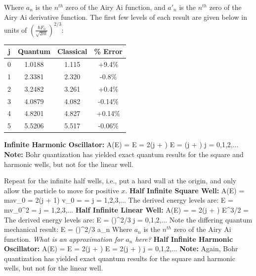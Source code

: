 \ee
Where $a_n$ is the $n^{th}$ zero of the Airy Ai function, and $a'_n$ is the $n^{th}$ zero of the Airy Ai derivative function. The first few levels of each result are given below in units of $\left(\frac{\hbar F_0}{\sqrt{2m}}\right)^{2/3}$:
\begin{center}
\begin{tabular}{ |c|c|c|c| } 
 \hline
 j & Quantum & Classical & \% Error \\ 
 \hline
 0 & 1.0188 & 1.115 & +9.4\% \\ 
 \hline
 1 & 2.3381 & 2.320 & -0.8\% \\ 
 \hline
 2 & 3.2482 & 3.261 & +0.4\% \\ 
 \hline
 3 & 4.0879 & 4.082 & -0.14\% \\
 \hline
 4 & 4.8201 & 4.827 & +0.14\% \\
 \hline
 5 & 5.5206 & 5.517 & -0.06\% \\
 \hline
\end{tabular}
\end{center}
\textbf{Infinite Harmonic Oscillator:} 
\be
A(E) = \frac{2\pi}{\omega}E = 2\pi\hbar\left(j + \right) \thus E = \hbar\omega \left(j + \right)  j = 0,1,2,...
\ee
\textbf{Note:} Bohr quantization has yielded exact quantum results for the square and harmonic wells, but not for the linear well.
\item Repeat for the infinite half wells, i.e., put a hard wall at the origin, and only allow the particle to move for positive $x$.
\newline \textbf{Half Infinite Square Well:}
\be
A(E) = mav_0 = 2\pi\hbar(j + 1) \thus v_0 =  =   j = 1,2,3,...
\ee
The derived energy levels are:
\be
E = mv_0^2 =   j = 1,2,3,...
\ee
\textbf{Half Infinite Linear Well:}
\be
A(E) =  = 2\pi\hbar\left(j + \right) \thus E^{3/2} = 
\ee
The derived energy levels are:
\be
E = \left(\right)^{2/3}  j = 0,1,2,...
\ee
Note the differing quantum mechanical result:
\be
E = \left(\right)^{2/3} \times a_n
\ee
Where $a_n$ is the $n^{th}$ zero of the Airy Ai function. \textit{What is an approximation for $a_n$ here?}
\newline \textbf{Half Infinite Harmonic Oscillator:}
\be
A(E) = \frac{\pi}{\omega}E = 2\pi\hbar\left(j + \right) \thus E = 2\hbar\omega \left(j + \right)  j = 0,1,2,...
\ee
\textbf{Note:} Again, Bohr quantization has yielded exact quantum results for the square and harmonic wells, but not for the linear well. 
\enu
\newpage
